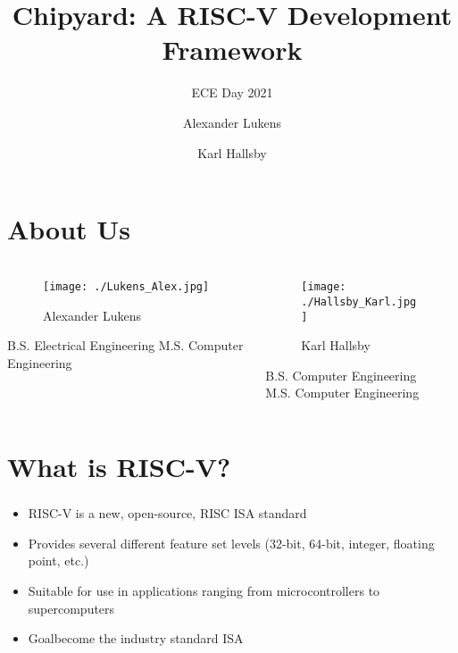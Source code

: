 \documentclass{eceday}
\title[Chipyard]{Chipyard: A RISC-V Development Framework}
\subtitle{ECE Day 2021}
\author{Alexander Lukens \and Karl Hallsby}
\institute{Illinois Institute of Technology}
\date{\DTMdisplaydate{2021}{4}{9}{-1}}
\begin{document}
\nocite{chipyard}
\nocite{firesimChipyardOverview}

\begin{frame}
  \titlepage{}
\end{frame}

\section{About Us}\label{sec:About_Us}
\begin{frame}
  \frametitle{}
  
  \begin{columns}
    \begin{column}{0.50\linewidth}
      \begin{figure}[h!tbp]
        \centering
        \texttt{[image: ./Lukens\_Alex.jpg]}
        \caption*{Alexander Lukens}
        \label{fig:Alex_Lukens}
      \end{figure}
  		\begin{centering}
  			B.S. Electrical Engineering
  			\newline M.S. Computer Engineering
  		\end{centering}

    \end{column}
    \begin{column}{0.50\linewidth}
      \begin{figure}[h!tbp]
        \centering
        \texttt{[image: ./Hallsby\_Karl.jpg]}
        \caption*{Karl Hallsby}
        \label{fig:Karl_Hallsby}
      \end{figure}
      B.S. Computer Engineering \\
      M.S. Computer Engineering
    \end{column}
  \end{columns}
\end{frame}

\section{What is RISC-V?}\label{sec:What_is_RISC-V}
\begin{frame}
  \frametitle{}
  \begin{itemize}
  	\item RISC-V is a new, open-source, RISC ISA standard
  	\item Provides several different feature set levels (32-bit, 64-bit, integer, floating point, etc.)
  	\item Suitable for use in applications ranging from microcontrollers to supercomputers
  	\item Goal\textrightarrow become the industry standard ISA
  \end{itemize}
  
  \cite{FireSimTalk1}
%  
\end{frame}
\end{document}
